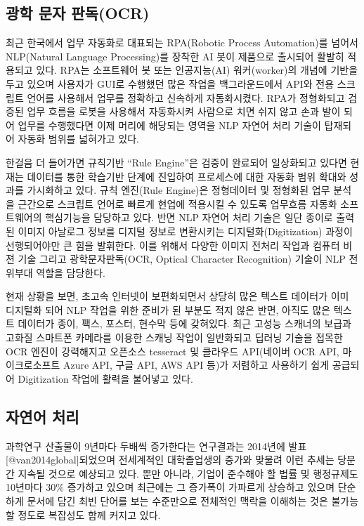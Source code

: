 \documentclass[smallextended]{svjour3}       %
\begin{document}
\hypertarget{uxad11uxd559-uxbb38uxc790-uxd310uxb3c5ocr}{%
\subsection{광학 문자
판독(OCR)}\label{uxad11uxd559-uxbb38uxc790-uxd310uxb3c5ocr}}

최근 한국에서 업무 자동화로 대표되는 RPA(Robotic Process Automation)를
넘어서 NLP(Natural Language Processing)를 장착한 AI 봇이 제품으로
출시되어 활발히 적용되고 있다. RPA는 소프트웨어 봇 또는 인공지능(AI)
워커(worker)의 개념에 기반을 두고 있으며 사용자가 GUI로 수행했던 많은
작업을 백그라운드에서 API와 전용 스크립트 언어를 사용해서 업무를
정확하고 신속하게 자동화시켰다. RPA가 정형화되고 검증된 업무 흐름을
로봇을 사용해서 자동화시켜 사람으로 치면 쉬지 않고 손과 발이 되어 업무를
수행했다면 이제 머리에 해당되는 영역을 NLP 자연어 처리 기술이 탑재되어
자동화 범위를 넓혀가고 있다.

한걸음 더 들어가면 규칙기반 ``Rule Engine''은 검증이 완료되어 일상화되고
있다면 현재는 데이터를 통한 학습기반 단계에 진입하여 프로세스에 대한
자동화 범위 확대와 성과를 가시화하고 있다. 규칙 엔진(Rule Engine)은
정형데이터 및 정형화된 업무 분석을 근간으로 스크립트 언어로 빠르게
현업에 적용시킬 수 있도록 업무흐름 자동화 소프트웨어의 핵심기능을
담당하고 있다. 반면 NLP 자연어 처리 기술은 일단 종이로 출력된 이미지
아날로그 정보를 디지털 정보로 변환시키는 디지털화(Digitization) 과정이
선행되어야만 큰 힘을 발휘한다. 이를 위해서 다양한 이미지 전처리 작업과
컴퓨터 비젼 기술 그리고 광학문자판독(OCR, Optical Character Recognition)
기술이 NLP 전위부대 역할을 담당한다.

현재 상황을 보면, 초고속 인터넷이 보편화되면서 상당히 많은 텍스트
데이터가 이미 디지털화 되어 NLP 작업을 위한 준비가 된 부분도 적지 않은
반면, 아직도 많은 텍스트 데이터가 종이, 팩스, 포스터, 현수막 등에
갖혀있다. 최근 고성능 스캐너의 보급과 고화질 스마트폰 카메라를 이용한
스캐닝 작업이 일반화되고 딥러닝 기술을 접목한 OCR 엔진이 강력해지고
오픈소스 tesseract 및 클라우드 API(네이버 OCR API, 마이크로소프트 Azure
API, 구글 API, AWS API 등)가 저렴하고 사용하기 쉽게 공급되어
Digitization 작업에 활력을 불어넣고 있다.

\hypertarget{uxc790uxc5f0uxc5b4-uxcc98uxb9ac}{%
\subsection{자연어 처리}\label{uxc790uxc5f0uxc5b4-uxcc98uxb9ac}}

과학연구 산출물이 9년마다 두배씩 증가한다는 연구결과는 2014년에
발표{[}@van2014global{]}되었으며 전세계적인 대학졸업생의 증가와 맞물려
이런 추세는 당분간 지속될 것으로 예상되고 있다. 뿐만 아니라, 기업이
준수해야 할 법률 및 행정규제도 10년마다 30\% 증가하고 있으며 최근에는 그
증가폭이 가파르게 상승하고 있으며 단순하게 문서에 담긴 최빈 단어를 보는
수준만으로 전체적인 맥락을 이해하는 것은 불가능할 정도로 복잡성도 함께
커지고 있다.
\end{document}
